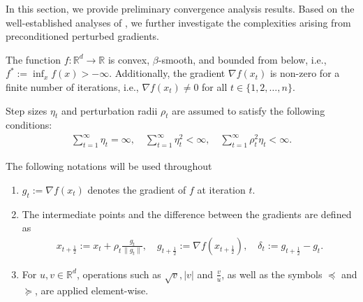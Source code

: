 In this section, we provide preliminary convergence analysis results.
Based on the well-established analyses of \citet{li2023convergence, khanh2024fundamental}, we further investigate the complexities arising from preconditioned perturbed gradients.\\

\begin{assumption}
    \label{assumption:convex_smooth_bounded_nonzero}
    The function $ f : \mathbb{R}^d \to \mathbb{R} $ is convex, $\beta$-smooth, and bounded from below, i.e., $ f^* := \inf_x f(x) > -\infty $. Additionally, the gradient $ \nabla f(x_t) $  is non-zero for a finite number of iterations, i.e., $ \nabla f(x_t) \neq 0 $ for all $ t \in \{1, 2, \dots, n\} $.
\end{assumption}
\vspace{5mm}
\begin{assumption}
    \label{assumption:learning_rate_and_perturbation_radius}
    Step sizes $\eta_t$ and perturbation radii $\rho_t$ are assumed to satisfy the following conditions:
    \begin{align*}
        \sum_{t=1}^{\infty} \eta_t = \infty, \quad \sum_{t=1}^{\infty} \eta_t^2 < \infty, \quad \sum_{t=1}^{\infty} \rho_t^2 \eta_t < \infty.
    \end{align*}
\end{assumption}
\vspace{3mm}
\begin{remark}
    The following notations will be used throughout
    \begin{enumerate}
        \item $ g_t := \nabla f(x_t) $ denotes the gradient of $ f $ at iteration $t$.
        \item The intermediate points and the difference between the gradients are defined as
        \begin{align*}
            x_{t+\frac{1}{2}} := x_t + \rho_t \frac{g_t}{\|g_t\|}, \quad g_{t+\frac{1}{2}} := \nabla f(x_{t+\frac{1}{2}}), \quad \delta_t := g_{t+\frac{1}{2}} - g_t.
        \end{align*}
        \item For $ u, v \in \mathbb{R}^d $, operations such as $ \sqrt{v}, |v| $ and $ \frac{v}{u} $, as well as the symbols $ \preceq $ and $ \succeq $, are applied element-wise.
    \end{enumerate}
\end{remark}
\vspace{3mm}
